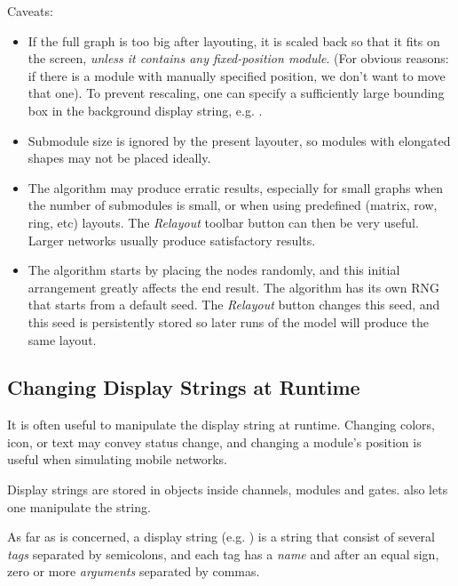 Caveats:

\begin{itemize}
  \item If the full graph is too big after layouting, it is scaled
    back so that it fits on the screen, \textit{unless it contains
    any fixed-position module}. (For obvious reasons: if there is a module
    with manually specified position, we don't want to move that one).
    To prevent rescaling, one can specify a sufficiently large bounding
    box in the background display string, e.g. .
  \item Submodule size is ignored by the present layouter, so modules
    with elongated shapes may not be placed ideally.
  \item The algorithm may produce erratic results, especially for small graphs
    when the number of submodules is small, or when using predefined
    (matrix, row, ring, etc) layouts. The \textit{Relayout} toolbar button
    can then be very useful. Larger networks usually produce
    satisfactory results.
  \item The algorithm starts by placing the nodes randomly, and this initial
    arrangement greatly affects the end result. The algorithm has its
    own RNG that starts from a default seed. The \textit{Relayout} button
    changes this seed, and this seed is persistently stored so later runs
    of the model will produce the same layout.
\end{itemize}


\subsection{Changing Display Strings at Runtime}
\label{sec:graphics:changing-displaystrings-at-runtime}

It is often useful to manipulate the display string at runtime.
Changing colors, icon, or text may convey status change, and
changing a module's position is useful when simulating mobile
networks.

Display strings are stored in  objects inside
channels, modules and gates.  also lets one
manipulate the string.

As far as  is concerned, a display string
(e.g. ) is a string that consist of several
\textit{tags} separated by semicolons, and each tag has a \textit{name}
and after an equal sign, zero or more \textit{arguments} separated by commas.

